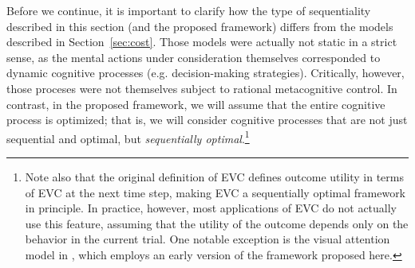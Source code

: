 Before we continue, it is important to clarify how the type of sequentiality described in this section (and the proposed framework) differs from the models described in Section~\ref{sec:cost}. Those models were actually not static in a strict sense, as the mental actions under consideration themselves corresponded to dynamic cognitive processes (e.g. decision-making strategies). Critically, however, those proceses were not themselves subject to rational metacognitive control. In contrast, in the proposed framework, we will assume that the entire cognitive process is optimized; that is, we will consider cognitive processes that are not just sequential and optimal, but \emph{sequentially optimal}.\footnote{%
  Note also that the original definition of EVC \citep{shenhav2013expected} defines outcome utility in terms of EVC at the next time step, making EVC a sequentially optimal framework in principle. In practice, however, most applications of EVC do not actually use this feature, assuming that the utility of the outcome depends only on the behavior in the current trial. One notable exception is the visual attention model in \citet{lieder2018rational}, which employs an early version of the framework proposed here.
}






